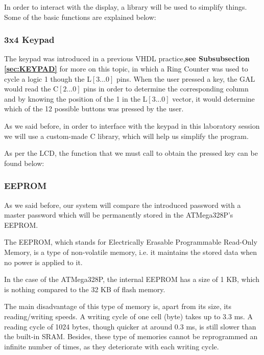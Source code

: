 \clearpage

In order to interact with the display, a library will be used to simplify things. Some of the basic functions are explained below:


\clearpage

\subsubsection{3x4 Keypad}

The keypad was introduced in a previous VHDL practice,\textbf{see Subsubsection \ref{sec:KEYPAD}} for more on this topic, in which a Ring Counter was used to cycle a logic 1 though the L$\left[3...0\right]$ pins. When the user pressed a key, the GAL would read the C$\left[2...0\right]$ pins in order to determine the corresponding column and by knowing the position of the 1 in the L$\left[3...0\right]$ vector, it would determine which of the 12 possible buttons was pressed by the user.\medskip

As we said before, in order to interface with the keypad in this laboratory session we will use a custom-made C library, which will help us simplify the program.\medskip

As per the LCD, the function that we must call to obtain the pressed key can be found below:


\clearpage

\subsubsection{EEPROM}

As we said before, our system will compare the introduced password with a master password which will be permanently stored in the ATMega328P's EEPROM. \medskip

The EEPROM, which stands for Electrically Erasable Programmable Read-Only Memory, is a type of non-volatile memory, i.e. it maintains the stored data when no power is applied to it.\medskip

In the case of the ATMega328P, the internal EEPROM has a size of 1 KB, which is nothing compared to the 32 KB of flash memory. \medskip

The main disadvantage of this type of memory is, apart from its size, its reading/writing speeds. A writing cycle of one cell (byte) takes up to 3.3 ms. A reading cycle of 1024 bytes, though quicker at around 0.3 ms, is still slower than the built-in SRAM. Besides, these type of memories cannot be reprogrammed an infinite number of times, as they deteriorate with each writing cycle.\medskip

